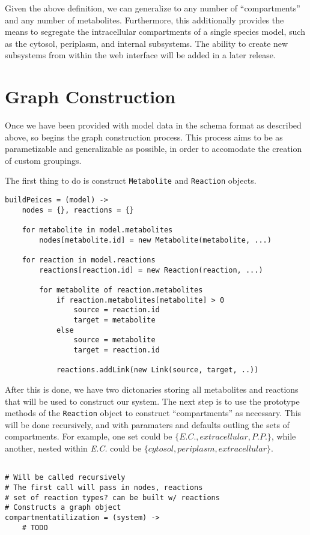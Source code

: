 Given the above definition, we can generalize to any number of ``compartments''
and any number of metabolites. Furthermore, this additionally provides the means
to segregate the intracellular compartments of a single species model, such as
the cytosol, periplasm, and internal subsystems. The ability to create new
subsystems from within the web interface will be added in a later release.

\section{Graph Construction}

Once we have been provided with model data in the schema format as described
above, so begins the graph construction process. This process aims to be
as parametizable and generalizable as possible, in order to accomodate
the creation of custom groupings.

The first thing to do is construct \texttt{Metabolite} and \texttt{Reaction}
objects.

\begin{verbatim}
buildPeices = (model) ->
    nodes = {}, reactions = {}

    for metabolite in model.metabolites
        nodes[metabolite.id] = new Metabolite(metabolite, ...)

    for reaction in model.reactions
        reactions[reaction.id] = new Reaction(reaction, ...)

        for metabolite of reaction.metabolites
            if reaction.metabolites[metabolite] > 0
                source = reaction.id
                target = metabolite
            else
                source = metabolite
                target = reaction.id

            reactions.addLink(new Link(source, target, ..))
\end{verbatim}

After this is done, we have two dictonaries storing all metabolites and
reactions that will be used to construct our system. The next step is to use the
prototype methods of the \texttt{Reaction} object to construct ``compartments''
as necessary. This will be done recursively, and with paramaters and defaults
outling the sets of compartments. For example, one set could be $\{E.C.,
extracellular, P.P.\}$, while another, nested within \textit{E.C.} could be
$\{cytosol, periplasm, extracellular\}$.

\begin{verbatim}

# Will be called recursively
# The first call will pass in nodes, reactions
# set of reaction types? can be built w/ reactions
# Constructs a graph object
compartmentatilization = (system) ->
    # TODO

\end{verbatim}


